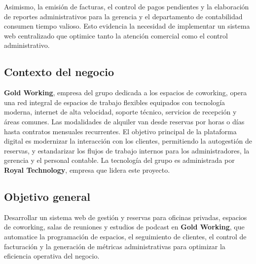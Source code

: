 \documentclass[12pt,a4paper]{article}
\begin{document}
Asimismo, la emisi\'on de facturas, el control de pagos pendientes y la elaboraci\'on de reportes administrativos para la gerencia y el departamento de contabilidad consumen tiempo valioso. Esto evidencia la necesidad de implementar un sistema web centralizado que optimice tanto la atenci\'on comercial como el control administrativo.

\subsection{Contexto del negocio}
\textbf{Gold Working}, empresa del grupo dedicada a los espacios de coworking, opera una red integral de espacios de trabajo flexibles equipados con tecnolog\'ia moderna, internet de alta velocidad, soporte t\'ecnico, servicios de recepci\'on y \'areas comunes. Las modalidades de alquiler van desde reservas por horas o d\'ias hasta contratos mensuales recurrentes. El objetivo principal de la plataforma digital es modernizar la interacci\'on con los clientes, permitiendo la autogesti\'on de reservas, y estandarizar los flujos de trabajo internos para los administradores, la gerencia y el personal contable. La tecnolog\'ia del grupo es administrada por \textbf{Royal Technology}, empresa que lidera este proyecto.

\subsection{Objetivo general}
Desarrollar un sistema web de gesti\'on y reservas para oficinas privadas, espacios de coworking, salas de reuniones y estudios de podcast en \textbf{Gold Working}, que automatice la programaci\'on de espacios, el seguimiento de clientes, el control de facturaci\'on y la generaci\'on de m\'etricas administrativas para optimizar la eficiencia operativa del negocio.
\end{document}
